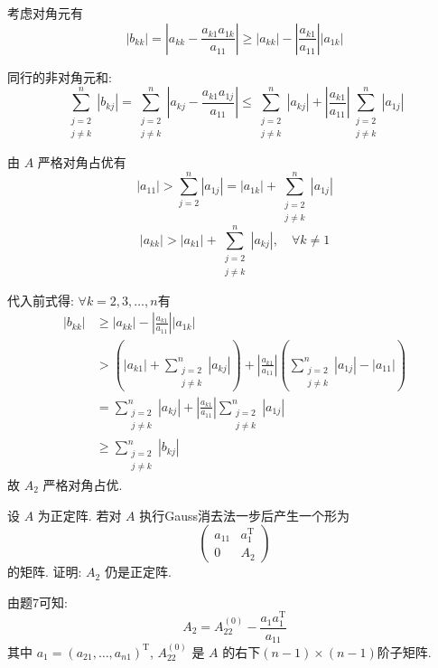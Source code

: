\documentclass[12pt, answers]{exam}     %
\newcommand{\T}{\mathrm{T}}
\begin{document}
\begin{questions}
\begin{solution}
考虑对角元有
\[ |b_{kk}| = \left| a_{kk} - \frac{a_{k1}a_{1k}}{a_{11}} \right| \geq |a_{kk}| - \left| \frac{a_{k1}}{a_{11}} \right| | a_{1k} |\]

同行的非对角元和: 
\[ \sum_{\substack{j=2 \\ j \neq k}}^n |b_{kj}| = \sum_{\substack{j=2 \\ j \neq k}}^n \left| a_{kj} - \frac{a_{k1}a_{1j}}{a_{11}} \right| \leq \sum_{\substack{j=2 \\ j \neq k}}^n |a_{kj}| + \left| \frac{a_{k1}}{a_{11}} \right| \sum_{\substack{j=2 \\ j \neq k}}^n |a_{1j}| \]

由 \( A \) 严格对角占优有
\[ |a_{11}| > \sum_{j=2}^n |a_{1j}| = |a_{1k}| + \sum_{\substack{j=2 \\ j \neq k}}^n |a_{1j}| \]
\[ |a_{kk}| > |a_{k1}| + \sum_{\substack{j=2 \\ j \neq k}}^n |a_{kj}| ,\quad \forall k \ne 1 \]

代入前式得: \( \forall k = 2, 3, \ldots, n \)有
\begin{align*}
|b_{kk}| &\geq |a_{kk}| - \left| \frac{a_{k1}}{a_{11}} \right| | a_{1k} | \\
&> (|a_{k1}| + \sum_{\substack{j=2 \\ j \neq k}}^n |a_{kj}|) + \left| \frac{a_{k1}}{a_{11}} \right| ( \sum_{\substack{j=2 \\ j \neq k}}^n |a_{1j}| - |a_{11}| )  \\
&= \sum_{\substack{j=2 \\ j \neq k}}^n |a_{kj}| + \left| \frac{a_{k1}}{a_{11}} \right| \sum_{\substack{j=2 \\ j \neq k}}^n |a_{1j}|  \\
&\geq \sum_{\substack{j=2 \\ j \neq k}}^n |b_{kj}|
\end{align*}
故 \( A_2 \) 严格对角占优. 
\end{solution}

\question{}
设 \( A \) 为正定阵. 若对 \( A \) 执行Gauss消去法一步后产生一个形为
\[
\begin{pmatrix}
a_{11} & a_1^{\T} \\
0 & A_2
\end{pmatrix}
\]
的矩阵. 证明: \( A_2 \) 仍是正定阵. 
\begin{solution}
由题7可知: 
\[ A_2 = A_{22}^{(0)} - \frac{a_1 a_1^{\T}}{a_{11}} \]
其中 \( a_1 = (a_{21}, \ldots, a_{n1})^{\T} \), \( A_{22}^{(0)} \) 是 \( A \) 的右下$(n - 1) \times (n - 1)$阶子矩阵.


\end{solution}
\end{questions}
\end{document}
